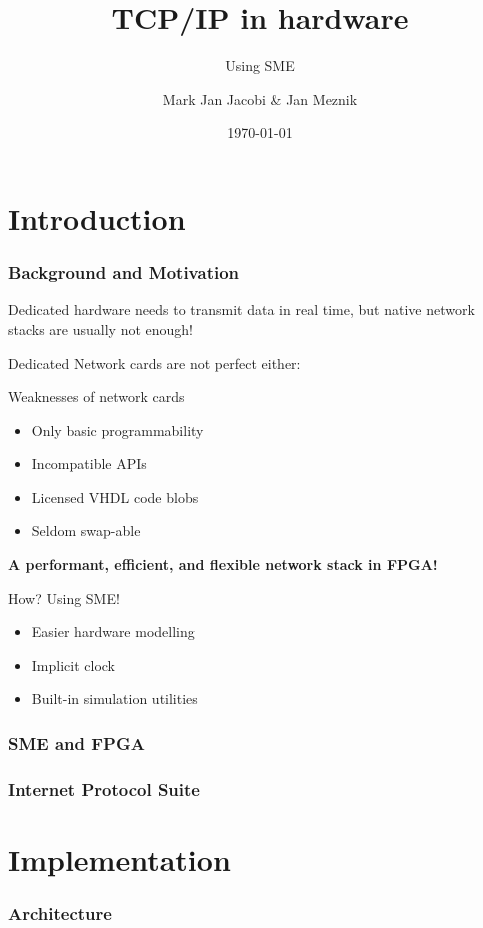 \documentclass{beamer}
\title{TCP/IP in hardware }
\subtitle{Using SME}
\author{Mark Jan Jacobi \& Jan Meznik}
\institute{University of Copenhagen}
\date{\today}
\begin{document}
\frame{\titlepage}

\section{Introduction}
\begin{frame}
  \frametitle{Background and Motivation}

  Dedicated hardware needs to transmit data in real time, but native network 
  stacks are usually not enough!

  Dedicated Network cards are not perfect either:
  \begin{alertblock}{Weaknesses of network cards}
    \begin{itemize}
      \item Only basic programmability
      \item Incompatible APIs 
      \item Licensed VHDL code blobs
      \item Seldom swap-able
    \end{itemize}
  \end{alertblock}
\end{frame}

\begin{frame}
\begin{center}
  \textbf{A performant, efficient, and flexible network stack in FPGA!}
\end{center}

\begin{block}{How?    Using SME!}
  \begin{itemize}
    \item Easier hardware modelling
    \item Implicit clock
    \item Built-in simulation utilities 
  \end{itemize}
\end{block}

\end{frame}

\begin{frame}
  \frametitle{SME and FPGA}

\end{frame}

\begin{frame}
  \frametitle{Internet Protocol Suite}

\end{frame}



\section{Implementation}
\begin{frame}
        \frametitle{Architecture}

\end{frame}
\end{document}
